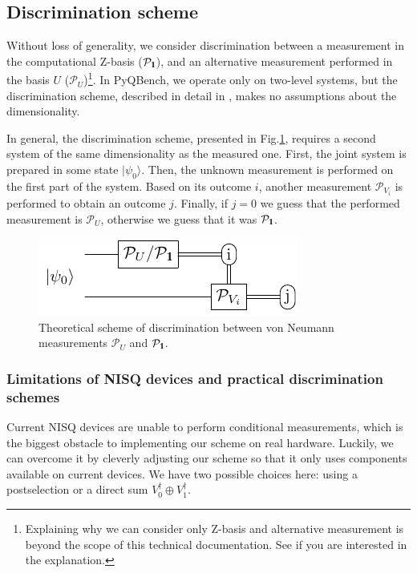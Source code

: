\documentclass[preprint,12pt, a4paper, dvipsnames]{elsarticle}
\newcommand{\ket}[1]{\ensuremath{|#1\rangle}}
\newcommand{\1}{{\rm 1\hspace{-0.9mm}l}}
\newcommand{\Id}{{\rm 1\hspace{-0.9mm}l}}
\newcommand{\PP}{\mathcal{P}}
\begin{document}
\subsection{Discrimination scheme}\label{sec:discrimination-scheme}

Without loss of generality, we consider discrimination between a measurement in the computational
Z-basis ($\PP_\Id$), and an alternative measurement performed in the basis $U$
($\PP_U$)\footnote{Explaining why we can consider only Z-basis and alternative measurement is beyond
	the scope of this technical documentation. See \cite{puchala2018strategies} if you are interested in
	the explanation.}. In PyQBench, we operate only on two-level systems, but the discrimination scheme,
described in detail in \cite{puchala2018strategies}, makes no assumptions about the dimensionality.

In general, the discrimination scheme, presented in Fig.\ref{fig:theoretical_scheme}, requires a
second system of the same dimensionality as the measured one. First, the joint system is prepared in
some state $\ket{\psi_0}$. Then, the unknown measurement is performed on the first part of the
system. Based on its outcome $i$, another measurement $\mathcal{P}_{V_i}$ is performed to obtain an
outcome $j$. Finally, if $j=0$ we guess that the performed measurement is $\mathcal{P}_U$, otherwise
we guess that it was $\mathcal{P}_\Id$.

\begin{figure}[h!]
	\centering
	\includegraphics[scale=1.7]{pics/theoretical_scheme}
	\caption{Theoretical  scheme of discrimination  between von Neumann measurements $\PP_{U}$ and $\PP_\Id$. }
	\label{fig:theoretical_scheme}
\end{figure}

\subsubsection{Limitations of NISQ devices and practical discrimination schemes}

Current NISQ devices are unable to perform conditional measurements, which is the biggest
obstacle to implementing our scheme on real hardware. Luckily, we can overcome it by
cleverly adjusting our scheme so that it only uses components available on current devices.
We have two possible choices here: using a postselection or a direct sum
$V_0^\dagger\oplus V_1^\dagger$.
\end{document}

